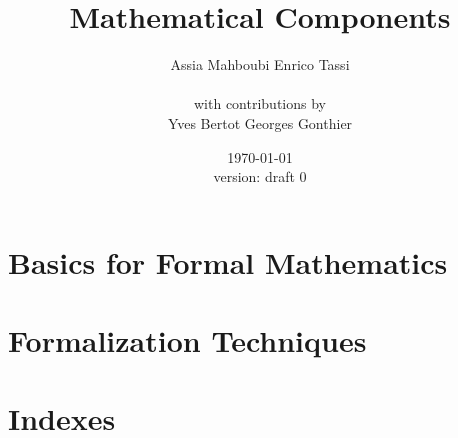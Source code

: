 \documentclass{book}
\title{Mathematical Components}
\author{Assia Mahboubi \hspace{1cm} Enrico Tassi\\~\\{\small with contributions by}\\Yves Bertot \hspace{1cm} Georges Gonthier}
\date{\today\\\small{version: draft 0}}
\begin{document}
\maketitle



\tableofcontents{}

\part{Basics for Formal Mathematics}\label{part:defproofs}






\part{Formalization Techniques}\label{part:form}






% 
% 
% 
% 
% 
% 
% 

\part{Indexes}

\printindex[concept]
\printindex[ssr]
\printindex[coq]
\printindex[vernac]



\end{document}
